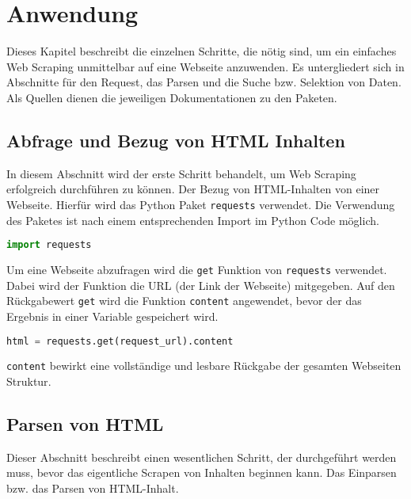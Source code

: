 
\chapter{Anwendung}
\label{chapter-anwendung}

Dieses Kapitel beschreibt die einzelnen Schritte, die nötig sind, um ein einfaches Web Scraping unmittelbar auf eine Webseite anzuwenden.
Es untergliedert sich in Abschnitte für den Request\cite{requests-readthedocs}, das Parsen\cite{bs4} und die Suche bzw. Selektion von Daten\cite{bs4}.
Als Quellen dienen die jeweiligen Dokumentationen zu den Paketen.

\section{Abfrage und Bezug von HTML Inhalten}

In diesem Abschnitt wird der erste Schritt behandelt,
um Web Scraping erfolgreich durchführen zu können. 
Der Bezug von HTML-Inhalten von einer Webseite.
Hierfür wird das Python Paket \texttt{requests} verwendet.
Die Verwendung des Paketes ist nach einem entsprechenden Import im Python Code möglich.

\begin{lstlisting}[language=Python,gobble=2]
  import requests
\end{lstlisting}

Um eine Webseite abzufragen wird die \texttt{get} Funktion von \texttt{requests} verwendet.
Dabei wird der Funktion die URL (der Link der Webseite) mitgegeben.
Auf den Rückgabewert \texttt{get} wird die Funktion \texttt{content} angewendet, bevor der das Ergebnis in einer Variable gespeichert wird.

\begin{lstlisting}[language=Python,gobble=2,label=lst:import]
  html = requests.get(request_url).content
\end{lstlisting}

\texttt{content} bewirkt eine vollständige und lesbare Rückgabe der gesamten Webseiten Struktur\cite{requests-readthedocs}.

\section{Parsen von HTML}

Dieser Abschnitt beschreibt einen wesentlichen Schritt, der durchgeführt werden muss, bevor das eigentliche Scrapen von Inhalten beginnen kann.
Das Einparsen bzw. das Parsen von HTML-Inhalt.

